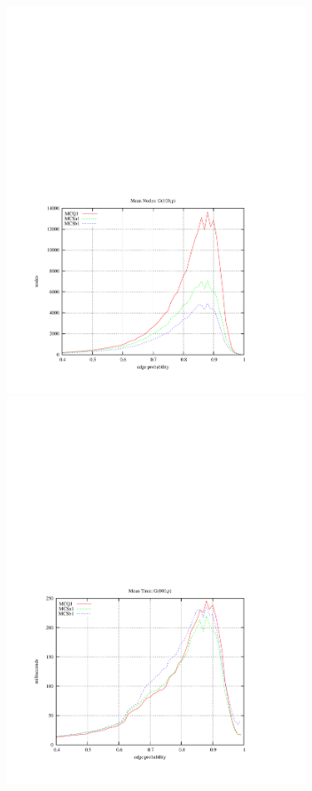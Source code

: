 \documentclass{l4proj}
\begin{document}
\begin{figure}
\vspace{-6cm}
\begin{center}
\hspace{-1.5cm}
\begin{minipage}[t]{0.49\textwidth}
\includegraphics[height=11.5cm]{nds-100.pdf}
\end{minipage}
\hfill
\begin{minipage}[t]{0.49\textwidth}
\includegraphics[height=11.5cm]{time-100.pdf}

\end{minipage}
\end{center}
\end{figure}
\end{document}

